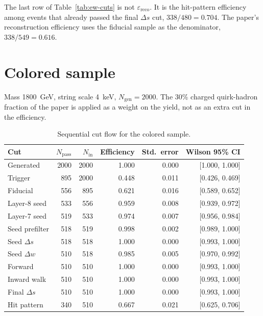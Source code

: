 \documentclass[11pt,a4paper]{article}
\begin{document}
The last row of Table~\ref{tab:ew-cuts} is not \(\varepsilon_{\mathrm{reco}}\).
It is the hit-pattern efficiency among events that already passed the final \(\Delta s\) cut, \(338/480 = 0.704\).
The paper's reconstruction efficiency uses the fiducial sample as the denominator, \(338/549 = 0.616\).

\section{Colored sample}
\label{sec:qcd}
Mass \SI{1800}{\GeV}, string scale \SI{4}{\keV}, \(N_{\mathrm{gen}} = 2000\).
The 30\% charged quirk-hadron fraction of the paper is applied as a weight on the yield, not as an extra cut in the efficiency.

\begin{table}[H]
\centering
\caption{Sequential cut flow for the colored sample.}
\label{tab:qcd-cuts}
\small
\begin{tabular}{lrrrrr}
\toprule
Cut & \(N_{\mathrm{pass}}\) & \(N_{\mathrm{in}}\) & Efficiency & Std.\ error & Wilson 95\% CI \\
\midrule
Generated        & 2000 & 2000 & 1.000 & 0.000 & [1.000, 1.000] \\
Trigger          &  895 & 2000 & 0.448 & 0.011 & [0.426, 0.469] \\
Fiducial         &  556 &  895 & 0.621 & 0.016 & [0.589, 0.652] \\
Layer-8 seed     &  533 &  556 & 0.959 & 0.008 & [0.939, 0.972] \\
Layer-7 seed     &  519 &  533 & 0.974 & 0.007 & [0.956, 0.984] \\
Seed prefilter   &  518 &  519 & 0.998 & 0.002 & [0.989, 1.000] \\
Seed \(\Delta s\) &  518 &  518 & 1.000 & 0.000 & [0.993, 1.000] \\
Seed \(\Delta w\) &  510 &  518 & 0.985 & 0.005 & [0.970, 0.992] \\
Forward          &  510 &  510 & 1.000 & 0.000 & [0.993, 1.000] \\
Inward walk      &  510 &  510 & 1.000 & 0.000 & [0.993, 1.000] \\
Final \(\Delta s\) &  510 &  510 & 1.000 & 0.000 & [0.993, 1.000] \\
Hit pattern      &  340 &  510 & 0.667 & 0.021 & [0.625, 0.706] \\
\bottomrule
\end{tabular}
\end{table}
\end{document}
